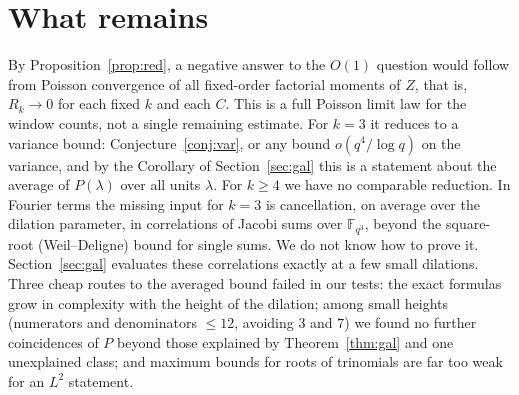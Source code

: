 \documentclass[11pt]{article}
\begin{document}
\section{What remains}\label{sec:rem}
By Proposition~\ref{prop:red}, a negative answer to the $O(1)$ question would follow from Poisson convergence of all fixed-order factorial moments of $Z$, that is, $R_k\to0$ for each fixed $k$ and each $C$.
This is a full Poisson limit law for the window counts, not a single remaining estimate. For $k=3$ it reduces to a variance bound: Conjecture~\ref{conj:var}, or any bound $o(q^4/\log q)$ on the variance,
and by the Corollary of Section~\ref{sec:gal} this is a statement about the average of $P(\lambda)$ over all units $\lambda$. For $k\ge4$ we have no comparable reduction. In
Fourier terms the missing input for $k=3$ is cancellation, on average over the dilation parameter, in correlations of Jacobi sums over
$\mathbb F_{q^3}$, beyond the square-root (Weil--Deligne) bound for single sums. We do not know how to prove it. Section~\ref{sec:gal} evaluates these correlations exactly at a few small dilations. Three cheap routes to the averaged bound failed in our tests: the exact formulas grow in complexity with the height of the dilation; among small heights (numerators and denominators $\le12$, avoiding $3$ and $7$) we found no further coincidences of $P$ beyond those explained by Theorem~\ref{thm:gal} and one unexplained class; and maximum bounds for roots of trinomials \cite{BCR} are far too weak for an $L^2$ statement.
\end{document}
